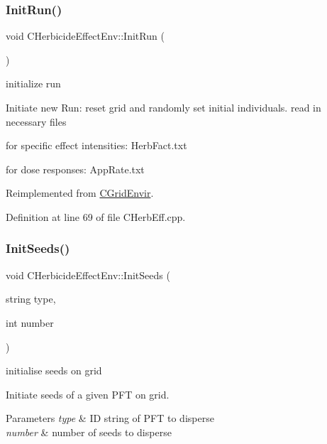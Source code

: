 \subsubsection{\texorpdfstring{InitRun()}{InitRun()}}
{\footnotesize\ttfamily void C\+Herbicide\+Effect\+Env\+::\+Init\+Run (\begin{DoxyParamCaption}{ }\end{DoxyParamCaption})\hspace{0.3cm}{\ttfamily [virtual]}}



initialize run 

Initiate new Run\+: reset grid and randomly set initial individuals. read in necessary files

for specific effect intensities\+: Herb\+Fact.\+txt

for dose responses\+: App\+Rate.\+txt 

Reimplemented from \mbox{\hyperlink{class_c_grid_envir_a5db9b9b5fb26f6f6cbc3b3904ace0b68}{C\+Grid\+Envir}}.



Definition at line 69 of file C\+Herb\+Eff.\+cpp.

\mbox{\label{class_c_herbicide_effect_env_a5832c475d9cda7d106b1750ce197843d}} 
\subsubsection{\texorpdfstring{InitSeeds()}{InitSeeds()}}
{\footnotesize\ttfamily void C\+Herbicide\+Effect\+Env\+::\+Init\+Seeds (\begin{DoxyParamCaption}\item[{string}]{type,  }\item[{int}]{number }\end{DoxyParamCaption})}



initialise seeds on grid 

Initiate seeds of a given P\+FT on grid. 
\begin{DoxyParams}{Parameters}
{\em type} & ID string of P\+FT to disperse \\
\hline
{\em number} & number of seeds to disperse \\
\hline
\end{DoxyParams}



